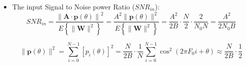 \begin{itemize}
\[
p_i(\theta) \triangleq \frac{1}{\sqrt{2B}} p\left(\frac{i}{2B}\right)
= \frac{1}{\sqrt{2B}} \cos\left(2\pi f_0 \frac{i}{2B} + \theta\right), \qquad
W_i \triangleq \frac{1}{\sqrt{2B}} W_B\left(\frac{i}{2B}\right)
\]

\[
X_i \in \mathcal{N}\left(A \cdot p_i(\theta), \sigma_W^2\right), \qquad
\left\{X_i\right\}_{i=0}^{N-1} \text{ are mutually independent}
\]
\vspace{0.5em}
\[
\mathbf{X} \text{ image of } X(t) \text{ for } t \in [0, T]
\]
\[
\mathbf{X} =
\begin{bmatrix}
X_0 \\ X_1 \\ \vdots \\ X_{N-1}
\end{bmatrix}
= A \cdot \mathbf{p}(\theta) + \mathbf{W}
=
\begin{bmatrix}
\frac{A}{\sqrt{2B}} \cos(\theta) \\
\frac{A}{\sqrt{2B}} \cos\left(2\pi f_0 \frac{1}{2B} + \theta \right) \\
\vdots \\
\frac{A}{\sqrt{2B}} \cos\left(2\pi f_0 \frac{N-1}{2B} + \theta \right)
\end{bmatrix}
+ 
\begin{bmatrix}
W_0 \\ W_1 \\ \vdots \\ W_{N-1}
\end{bmatrix}
\]

\[
W_i \in \mathcal{N}(0, \sigma^2_W),\quad \text{where } \sigma^2_W = \mathrm{var}\{W_i\} = \frac{N_0}{2} \quad \Longrightarrow \quad X_i \in \mathcal{N}(A \cdot p_i(\theta), \sigma^2_W)
\]

\[
p_i(\theta) = \frac{1}{\sqrt{2B}} \cos\left(2\pi f_0 \frac{i}{2B} + \theta\right) 
= \frac{1}{\sqrt{2B}} \cos(2\pi F_0 i + \theta)
\]

\[
F_0 \triangleq \frac{f_0}{2B} \qquad \text{Digital Frequency - Nyquist Sampling} \qquad 0 < F_0 < \frac{1}{2}
\]
    \item The input Signal to Noise power Ratio (\(SNR_{in}\)):
\[
SNR_{in} = \frac{\left\|\mathbf{A} \cdot \mathbf{p}(\theta)\right\|^2}{E\left\{\|\mathbf{W}\|^2\right\}}
= \frac{A^2 \|\mathbf{p}(\theta)\|^2}{E\left\{ \|\mathbf{W}\|^2 \right\}}
= \frac{A^2}{2B} \cdot \frac{N}{2} \cdot \frac{2}{N_0N}
= \frac{A^2}{2N_0B}
\]

\[
\|\mathbf{p}(\theta)\|^2 = \sum_{i=0}^{N-1} \left[ p_i(\theta) \right]^2
= \frac{N}{2B} \cdot \frac{1}{N} \sum_{i=0}^{N-1} \cos^2(2\pi F_0 i + \theta)
\approx \frac{N}{2B} \cdot \frac{1}{2}
\]


\end{itemize}
